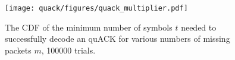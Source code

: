 \begin{figure}[t]
    \centering
    \texttt{[image: quack/figures/quack\_multiplier.pdf]}
    \caption{The CDF of the minimum number of symbols $t$ needed to successfully
    decode an quACK for various numbers of missing packets $m$, 100000 trials.}
    \label{fig:iblt-quack}
\end{figure}